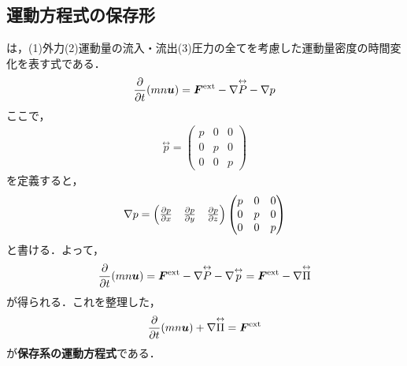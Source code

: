 \documentclass{report}
\begin{document}
  \subsection{運動方程式の保存形}
    は，(1)外力(2)運動量の流入・流出(3)圧力の全てを考慮した運動量密度の時間変化を表す式である．
    \begin{align}
      \pdv{t}(mn\bm{u}) = \bm{F}^{\mathrm{ext}} - \nabla \overset{\leftrightarrow}{P} - \nabla p
    \end{align}
    ここで，
    \begin{align}
      \overset{\leftrightarrow}{p} = 
      \begin{pmatrix}
        p & 0 & 0\\
        0 & p & 0\\
        0 & 0 & p
      \end{pmatrix}
    \end{align}
    を定義すると，
    \begin{align}
      \nabla p = \begin{pmatrix}
        \pdv{p}{x}&
        \pdv{p}{y}&
        \pdv{p}{z}
      \end{pmatrix}
      \begin{pmatrix}
        p & 0 & 0\\
        0 & p & 0\\
        0 & 0 & p
      \end{pmatrix}
    \end{align}
    と書ける．よって，
    \begin{align}
      \pdv{t}(mn\bm{u}) = \bm{F}^{\mathrm{ext}} - \nabla \overset{\leftrightarrow}{P} - \nabla \overset{\leftrightarrow}{p} = \bm{F}^{\mathrm{ext}} - \nabla \overset{\leftrightarrow}{\Pi}
    \end{align}
    が得られる．これを整理した，
    \begin{align}
      \pdv{t}(mn\bm{u}) + \nabla \overset{\leftrightarrow}{\Pi} = \bm{F}^{\mathrm{ext}}
    \end{align}
    が\textbf{保存系の運動方程式}である．
\end{document}
